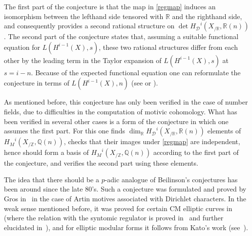 \documentclass{amsart}
\begin{document}
The first part of the conjecture is that
the map in \eqref{regmap} induces an isomorphism between the lefthand side tensored with ${\mathbb R}$ and the
righthand side, and
consequently provides a second rational structure on $\det{H_{\mathcal D}}^i(X_{/{\mathbb R}},{\mathbb R}(n))$.
The second part of the conjecture states that, assuming a suitable functional equation for
$ L(H^{i-1}(X),s) $, these two rational structures differ from each other by the
leading term in the Taylor expansion of $ L(H^{i-1}(X),s) $
at $ s=i-n $.  Because of the expected functional equation one can reformulate the conjecture in terms
of $ L(H^{i-1}(X),n) $ (see \cite[Corollary~3.6.2]{bei85} or \cite[4.12]{Jan88b}).

As mentioned before, this conjecture has only been verified in the case of number
fields, due to difficulties in the computation of motivic
cohomology. What has been verified in several other cases is a 
form of the conjecture in which one assumes the first part.
For this one finds $\dim_{\mathbb R} {H_{\mathcal D}}^i(X_{/{\mathbb R}},{\mathbb R}(n)) $ elements of
${H_M}^i(X_{/{\mathbb Z}},{\mathbb Q}(n))$, checks that their images under \eqref{regmap} are
independent, hence should form a basis of $ {H_M}^i(X_{/{\mathbb Z}},{\mathbb Q}(n))$ according to the
first part of the conjecture, and verifies the second part using these
elements.

The idea that there should be a $p$-adic analogue of Beilinson's
conjectures has been around since the late 80's.  Such a conjecture was
formulated and proved by Gros in~\cite{Gro90,Gro94} in the case of Artin
motives associated with Dirichlet characters.
In the weak sense mentioned before, it was proved for certain CM elliptic curves
in~\cite{Col-Gro89} (where the relation with the syntomic regulator is proved
in~\cite{Bes98b} and further elucidated in~\cite{Bes-Den99}), and for elliptic
modular forms it follows from Kato's work (see~\cite{Scho98}).
\end{document}
